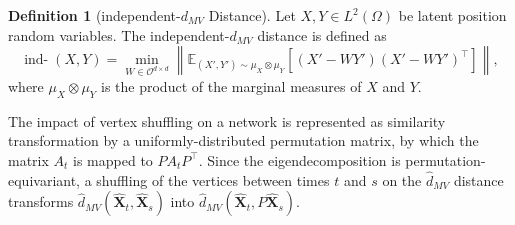 \documentclass[12pt]{article}
\newcommand{\EE}{\mathbb{E}}
\theoremstyle{definition}
\newtheorem{definition}{Definition}
\newcommand{\bX}{\mathbf{X}}
\newcommand{\inddmv}[1][]{\mathop{\mbox{ind-$d_{MV}^{#1}$}}}
\begin{document}
%


\begin{definition}[independent-$d_{MV}$ Distance]
\label{def:independent_d_MV}
Let $X,Y\in L^2(\Omega)$ be latent position random variables. The independent-$d_{MV}$ distance is defined as
$$\inddmv(X,Y) = \min_{W\in\mathcal{O}^{d\times d}} \left\|\EE_{(X',Y')\sim \mu_X \otimes \mu_Y}[(X'-WY')(X'-WY')^\top]\right\|,$$
where $\mu_{X}\otimes \mu_{Y}$ is the product of the marginal measures of $X$ and $Y$.
\end{definition}
The impact of vertex shuffling on a network is represented as similarity transformation by a uniformly-distributed permutation matrix, by which the matrix $A_t$  is mapped to  $PA_t P^\top$. Since the eigendecomposition is permutation-equivariant, a shuffling of the vertices between times $t$ and $s$ on the $\hat{d}_{MV}$ distance transforms 
$\hat{d}_{MV}(\hat{\bX}_t,\hat{\bX}_s)$ into $\hat{d}_{MV}(\hat{\bX}_t,P\hat{\bX}_s).
$
\end{document}
